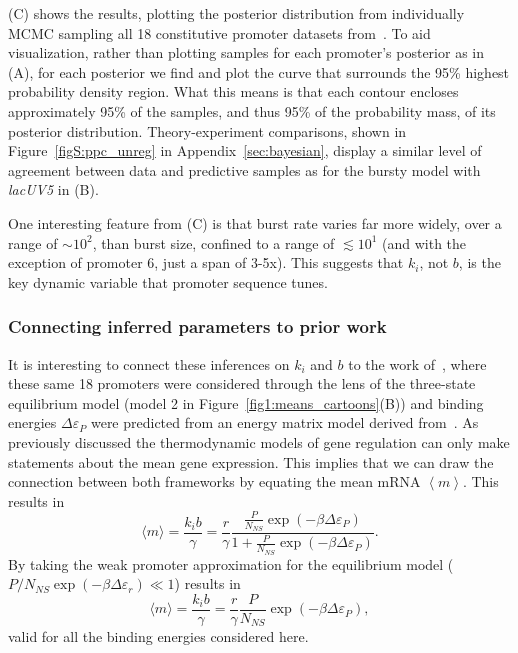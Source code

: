 (C) shows the results, plotting the posterior
distribution from individually MCMC sampling all 18 constitutive promoter
datasets from~\cite{Jones2014}. To aid visualization, rather than plotting
samples for each promoter's posterior as in (A), for
each posterior we find and plot the curve that surrounds the 95\% highest
probability density region. What this means is that each contour 
encloses approximately 95\% of the samples, and thus 95\% of the probability
mass, of its posterior distribution. Theory-experiment comparisons,
shown in Figure~\ref{figS:ppc_unreg} in Appendix~\ref{sec:bayesian},
display a similar level of agreement between data and predictive samples as for
the bursty model with \textit{lacUV5} in (B).

One interesting feature from (C) is that burst rate
varies far more widely, over a range of $\sim10^2$, than burst size, confined to
a range of $\lesssim10^1$ (and with the exception of promoter 6, just a span of
3-5x). This suggests that $k_i$, not $b$, is the key dynamic variable that
promoter sequence tunes.

\subsubsection{Connecting inferred parameters to prior work}
It is interesting to connect these inferences on $k_i$ and $b$ to the work
of~\cite{Brewster2012}, where these same 18 promoters were considered through
the lens of the three-state equilibrium model (model 2 in
Figure~\ref{fig1:means_cartoons}(B)) and binding energies $\Delta\varepsilon_P$
were predicted from an energy matrix model derived from~\cite{Kinney2010}. As
previously discussed the thermodynamic models of gene regulation can only make
statements about the mean gene expression. This implies that we can draw the
connection between both frameworks by equating the mean mRNA $\left\langle m
\right\rangle$. This results in
\begin{equation}
\langle m \rangle = \frac{k_i b}{\gamma}
        = \frac{r}{\gamma}
        \frac{\frac{P}{N_{NS}}\exp(-\beta\Delta\varepsilon_P)}
                {1+\frac{P}{N_{NS}}\exp(-\beta\Delta\varepsilon_P)}.
\end{equation}
By taking the weak promoter approximation for the equilibrium model ($P/N_{NS} 
\exp(-\beta\Delta\varepsilon_r) \ll 1$) results in
\begin{equation}
\langle m \rangle = \frac{k_i b}{\gamma}
        = \frac{r}{\gamma} \frac{P}{N_{NS}}\exp(-\beta\Delta\varepsilon_P),
\end{equation}
valid for all the binding energies considered here.

